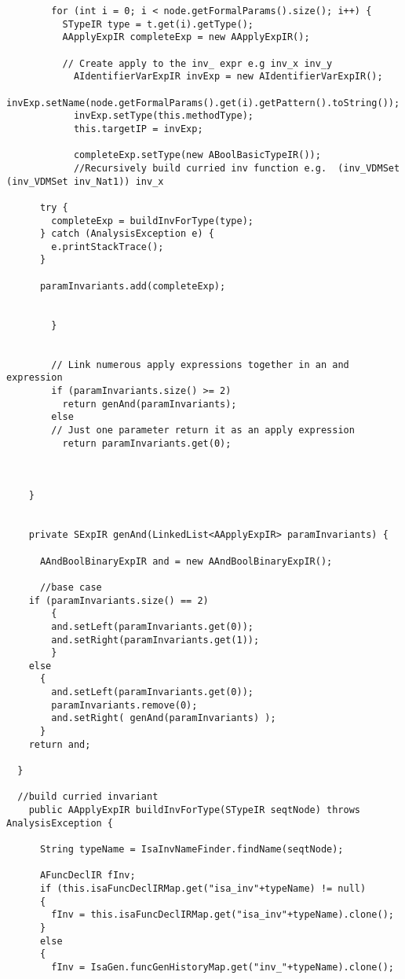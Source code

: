 \begin{appendices}
\begin{lstlisting}
        for (int i = 0; i < node.getFormalParams().size(); i++) {
          STypeIR type = t.get(i).getType();      
          AApplyExpIR completeExp = new AApplyExpIR();
          
          // Create apply to the inv_ expr e.g inv_x inv_y
            AIdentifierVarExpIR invExp = new AIdentifierVarExpIR();
            invExp.setName(node.getFormalParams().get(i).getPattern().toString());
            invExp.setType(this.methodType);
            this.targetIP = invExp;
      
            completeExp.setType(new ABoolBasicTypeIR());
            //Recursively build curried inv function e.g.  (inv_VDMSet (inv_VDMSet inv_Nat1)) inv_x
           
      try {
        completeExp = buildInvForType(type);
      } catch (AnalysisException e) {
        e.printStackTrace();
      }
      
      paramInvariants.add(completeExp);
              
            
        }
        
        
        // Link numerous apply expressions together in an and expression
        if (paramInvariants.size() >= 2)
          return genAnd(paramInvariants);
        else
        // Just one parameter return it as an apply expression
          return paramInvariants.get(0);
        
        
      
    }
     
    
    private SExpIR genAnd(LinkedList<AApplyExpIR> paramInvariants) {
      
      AAndBoolBinaryExpIR and = new AAndBoolBinaryExpIR();
      
      //base case
    if (paramInvariants.size() == 2)
        {
        and.setLeft(paramInvariants.get(0));
        and.setRight(paramInvariants.get(1));
        }
    else
      {
        and.setLeft(paramInvariants.get(0));
        paramInvariants.remove(0);
        and.setRight( genAnd(paramInvariants) );
      }
    return and;
    
  }

  //build curried invariant
    public AApplyExpIR buildInvForType(STypeIR seqtNode) throws AnalysisException {
      
      String typeName = IsaInvNameFinder.findName(seqtNode);
      
      AFuncDeclIR fInv;
      if (this.isaFuncDeclIRMap.get("isa_inv"+typeName) != null)
      {
        fInv = this.isaFuncDeclIRMap.get("isa_inv"+typeName).clone();
      }
      else
      {
        fInv = IsaGen.funcGenHistoryMap.get("inv_"+typeName).clone();
        

\end{lstlisting}
\end{appendices}
